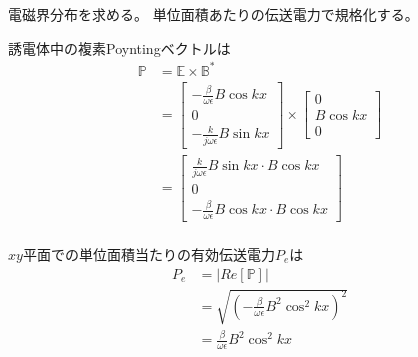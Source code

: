 \documentclass[a4paper,10pt]{bxjsarticle}
\begin{document}
\newpage

電磁界分布を求める。
単位面積あたりの伝送電力で規格化する。

誘電体中の複素Poyntingベクトルは
\begin{align*}
    \mathbb{P} &= \mathbb{E} \times \mathbb{B}^* \\
    &= \begin{bmatrix}
        - \frac{\beta}{\omega \epsilon} B \cos kx \\
        0 \\
        -\frac{k}{j\omega \epsilon} B \sin kx
    \end{bmatrix} \times
    \begin{bmatrix}
        0 \\
        B \cos kx \\
        0
    \end{bmatrix} \\
    &= \begin{bmatrix}
        \frac{k}{j\omega \epsilon} B \sin kx \cdot B \cos kx \\
        0 \\
        - \frac{\beta}{\omega \epsilon} B \cos kx \cdot B \cos kx 
    \end{bmatrix} \\
\end{align*}

$xy$平面での単位面積当たりの有効伝送電力$P_e$は
\begin{align*}
    P_e &= | Re \left[ \mathbb{P} \right] | \\
    &= \sqrt{ \left(-\frac{\beta}{\omega \epsilon} B^2 \cos^2 kx \right)^2} \\
    &= \frac{\beta}{\omega \epsilon} B^2 \cos^2 kx \\
\end{align*}
\end{document}
